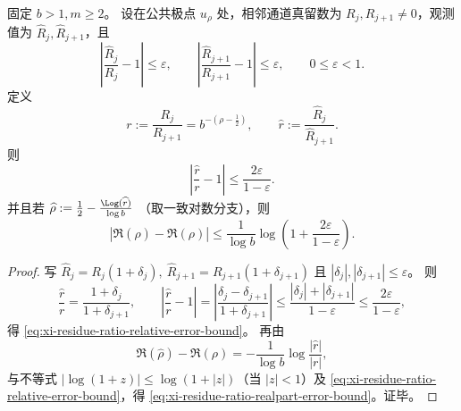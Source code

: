 \begin{proposition}[留数观测误差到零点实部误差的显式传播界]\label{prop:xi-residue-ratio-error-propagation-realpart}
固定 \(b>1,m\ge2\)。
设在公共极点 \(u_\rho\) 处，相邻通道真留数为 \(R_j,R_{j+1}\neq 0\)，观测值为
\(\widehat R_j,\widehat R_{j+1}\)，且
\[
\left|\frac{\widehat R_j}{R_j}-1\right|\le\varepsilon,\qquad
\left|\frac{\widehat R_{j+1}}{R_{j+1}}-1\right|\le\varepsilon,\qquad
0\le\varepsilon<1.
\]
定义
\[
r:=\frac{R_j}{R_{j+1}}=b^{-(\rho-\frac12)},
\qquad
\widehat r:=\frac{\widehat R_j}{\widehat R_{j+1}}.
\]
则
\begin{equation}\label{eq:xi-residue-ratio-relative-error-bound}
\left|\frac{\widehat r}{r}-1\right|
\le
\frac{2\varepsilon}{1-\varepsilon}.
\end{equation}
并且若
\(
\widehat\rho:=\frac12-\frac{\Log(\widehat r)}{\log b}
\)
（取一致对数分支），则
\begin{equation}\label{eq:xi-residue-ratio-realpart-error-bound}
\left|\Re(\widehat\rho)-\Re(\rho)\right|
\le
\frac{1}{\log b}
\log\!\left(1+\frac{2\varepsilon}{1-\varepsilon}\right).
\end{equation}
\end{proposition}

\begin{proof}
写
\(
\widehat R_j=R_j(1+\delta_j),\ 
\widehat R_{j+1}=R_{j+1}(1+\delta_{j+1})
\)
且 \(|\delta_j|,|\delta_{j+1}|\le\varepsilon\)。
则
\[
\frac{\widehat r}{r}
=\frac{1+\delta_j}{1+\delta_{j+1}},
\qquad
\left|\frac{\widehat r}{r}-1\right|
=\left|\frac{\delta_j-\delta_{j+1}}{1+\delta_{j+1}}\right|
\le\frac{|\delta_j|+|\delta_{j+1}|}{1-\varepsilon}
\le \frac{2\varepsilon}{1-\varepsilon},
\]
得 \eqref{eq:xi-residue-ratio-relative-error-bound}。
再由
\[
\Re(\widehat\rho)-\Re(\rho)
=-\frac{1}{\log b}\log\frac{|\widehat r|}{|r|},
\]
与不等式 \(|\log(1+z)|\le \log(1+|z|)\)（当 \(|z|<1\)）及
\eqref{eq:xi-residue-ratio-relative-error-bound}，得
\eqref{eq:xi-residue-ratio-realpart-error-bound}。证毕。
\end{proof}

